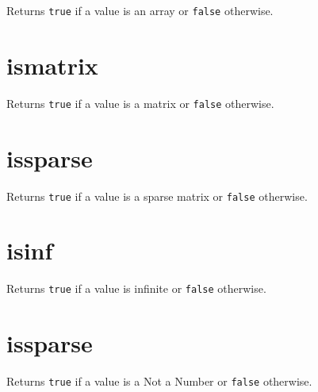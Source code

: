 Returns \texttt{true} if a value is an array or \texttt{false}
otherwise.

\hypertarget{ismatrix}{%
\section{ismatrix}\label{ismatrix}}

Returns \texttt{true} if a value is a matrix or \texttt{false}
otherwise.

\hypertarget{issparse}{%
\section{issparse}\label{issparse}}

Returns \texttt{true} if a value is a sparse matrix or \texttt{false}
otherwise.

\hypertarget{isinf}{%
\section{isinf}\label{isinf}}

Returns \texttt{true} if a value is infinite or \texttt{false}
otherwise.

\hypertarget{issparse-1}{%
\section{issparse}\label{issparse-1}}

Returns \texttt{true} if a value is a Not a Number or \texttt{false}
otherwise.
